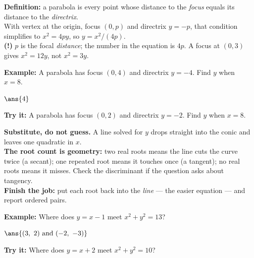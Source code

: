 \documentclass[12pt]{article}
\begin{document}
\begin{formulabox}
\textbf{Definition:} a parabola is every point whose distance to the
\emph{focus} equals its distance to the \emph{directrix}.\\[3pt]
With vertex at the origin, focus $(0, p)$ and directrix $y = -p$, that
condition simplifies to $x^2 = 4py$, so $y = x^2/(4p)$.\\[3pt]
\textbf{(!)} $p$ is the focal \emph{distance}; the number in the equation is
$4p$. A focus at $(0,3)$ gives $x^2 = 12y$, not $x^2 = 3y$.
\end{formulabox}
\begin{examplebox}
\textbf{Example:} A parabola has focus $(0, 4)$ and directrix $y = -4$. Find
$y$ when $x = 8$.
\par
$\ans{4}$
\end{examplebox}
\begin{tryitbox}
\textbf{Try it:} A parabola has focus $(0, 2)$ and directrix $y = -2$. Find
$y$ when $x = 8$.\\[2pt]
\end{tryitbox}

\begin{formulabox}
\textbf{Substitute, do not guess.} A line solved for $y$ drops straight into
the conic and leaves one quadratic in $x$.\\[3pt]
\textbf{The root count is geometry:} two real roots means the line cuts the
curve twice (a secant); one repeated root means it touches once (a tangent);
no real roots means it misses. Check the discriminant if the question asks
about tangency.\\[3pt]
\textbf{Finish the job:} put each root back into the \emph{line} --- the
easier equation --- and report ordered pairs.
\end{formulabox}
\begin{examplebox}
\textbf{Example:} Where does $y = x - 1$ meet $x^2 + y^2 = 13$?
\par
$\ans{(3,\ 2) \text{ and } (-2,\ -3)}$
\end{examplebox}
\begin{tryitbox}
\textbf{Try it:} Where does $y = x + 2$ meet $x^2 + y^2 = 10$?\\[2pt]
\end{tryitbox}
\end{document}
